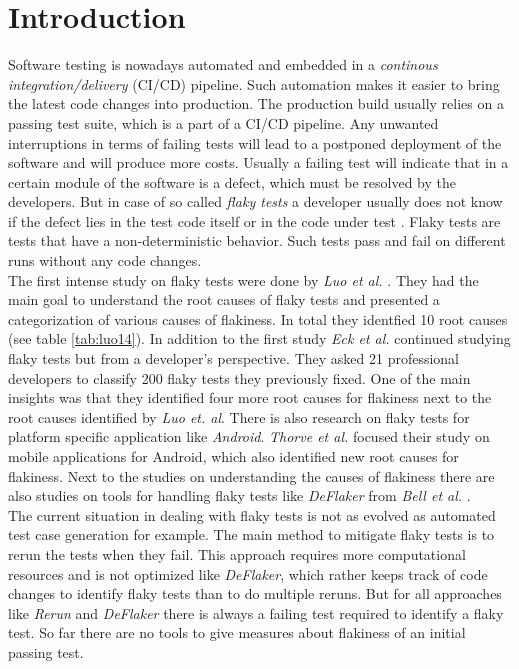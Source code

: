 \documentclass{seal_thesis}
\begin{document}
\chapter{Introduction}
Software testing is nowadays automated and embedded in a \textit{continous integration/delivery} (CI/CD) pipeline. Such automation makes it easier to bring the latest code changes into production. The production build usually relies on a passing test suite, which is a part of a CI/CD pipeline. Any unwanted interruptions in terms of failing tests will lead to a postponed deployment of the software and will produce more costs. Usually a failing test will indicate that in a certain module of the software is a defect, which must be resolved by the developers. But in case of so called \textit{flaky tests} a developer usually does not know if the defect lies in the test code itself or in the code under test \cite{daniel09}. Flaky tests are tests that have a non-deterministic behavior. Such tests pass and fail on different runs without any code changes. \\

\noindent The first intense study on flaky tests were done by \textit{Luo et al.} \cite{luo14}. They had the main goal to understand the root causes of flaky tests and presented a categorization of various causes of flakiness. In total they identfied 10 root causes (see table \ref{tab:luo14}). In addition to the first study \textit{Eck et al.} \cite{eck19} continued studying flaky tests but from a developer's perspective. They asked 21 professional developers to classify 200 flaky tests they previously fixed. One of the main insights was that they identified four more root causes for flakiness next to the root causes identified by \textit{Luo et. al}. There is also research on flaky tests for platform specific application like \textit{Android}. \textit{Thorve et al.} \cite{thorve18} focused their study on mobile applications for Android, which also identified new root causes for flakiness. Next to the studies on understanding the causes of flakiness there are also studies on tools for handling flaky tests like \textit{DeFlaker} from \textit{Bell et al.} \cite{bell18}. \\

\noindent The current situation in dealing with flaky tests is not as evolved as automated test case generation for example. The main method to mitigate flaky tests is to rerun the tests when they fail. This approach requires more computational resources and is not optimized like \textit{DeFlaker}, which rather keeps track of code changes to identify flaky tests than to do multiple reruns. But for all  approaches like \textit{Rerun} and \textit{DeFlaker} there is always a failing test required to identify a flaky test. So far there are no tools to give measures about flakiness of an initial passing test. \\
\end{document}
